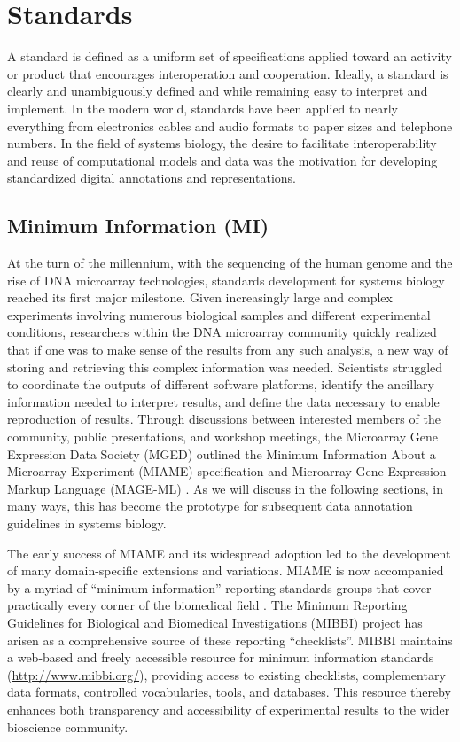 \documentclass[]{article}
\begin{document}
\section{Standards}

A standard is defined as a uniform set of specifications applied toward
an activity or product that encourages interoperation and cooperation.
Ideally, a standard is clearly and unambiguously defined and while
remaining easy to interpret and implement. In the modern world,
standards have been applied to nearly everything from electronics cables
and audio formats to paper sizes and telephone numbers. In the field of
systems biology, the desire to facilitate interoperability and reuse of
computational models and data was the motivation for developing
standardized digital annotations and representations.

\subsection{Minimum Information (MI)}

At the turn of the millennium, with the sequencing of the human genome
and the rise of DNA microarray technologies, standards development for
systems biology reached its first major milestone. Given increasingly
large and complex experiments involving numerous biological samples and
different experimental conditions, researchers within the DNA microarray
community quickly realized that if one was to make sense of the results
from any such analysis, a new way of storing and retrieving this complex
information was needed. Scientists struggled to coordinate the outputs
of different software platforms, identify the ancillary information
needed to interpret results, and define the data necessary to enable
reproduction of results. Through discussions between interested members
of the community, public presentations, and workshop meetings, the
Microarray Gene Expression Data Society (MGED) outlined the Minimum
Information About a Microarray Experiment (MIAME) specification
\autocite{brazma2001minimum} and Microarray Gene Expression Markup
Language (MAGE-ML) \autocite{spellman2002design}. As we will discuss in
the following sections, in many ways, this has become the prototype
\autocite{quackenbush2006standardizing} for subsequent data annotation
guidelines in systems biology.

The early success of MIAME and its widespread adoption led to the
development of many domain-specific extensions and variations. MIAME is
now accompanied by a myriad of ``minimum information'' reporting
standards groups that cover practically every corner of the biomedical
field \autocite{naturebiotechnology2006}. The Minimum Reporting
Guidelines for Biological and Biomedical Investigations (MIBBI)
\autocite{taylor2008promoting} project has arisen as a comprehensive
source of these reporting ``checklists''. MIBBI maintains a web-based
and freely accessible resource for minimum information standards
(\url{http://www.mibbi.org/}), providing access to existing checklists,
complementary data formats, controlled vocabularies, tools, and
databases. This resource thereby enhances both transparency and
accessibility of experimental results to the wider bioscience community.
\end{document}
